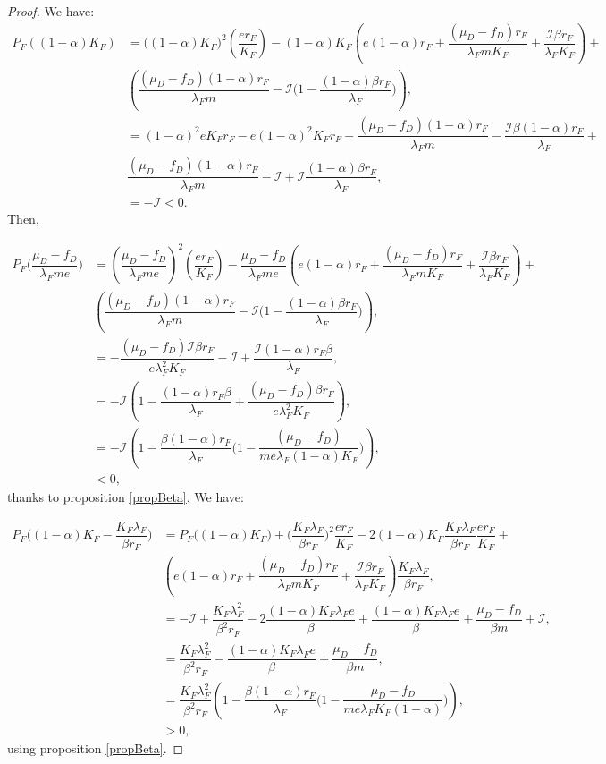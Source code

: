 \documentclass{article}
\newcommand{\lfw}{\lambda_{F}}
\newcommand{\lfw}{\lambda_{F}}
\newcommand{\cI}{\mathcal{I}}
\begin{document}
\begin{proof}
We have:
\begin{align*}
P_F((1-\alpha) K_F) &= \Big((1-\alpha) K_F \Big)^2 \left(\dfrac{er_F}{K_F} \right) - (1-\alpha) K_F \left(e(1-\alpha)r_F + \dfrac{(\mu_D - f_D) r_F}{\lfw m K_F} + \dfrac{\cI \beta r_F}{\lfw K_F} \right) + \\ &\left(\dfrac{(\mu_D - f_D)(1-\alpha) r_F}{\lfw m} - \cI\Big(1 - \dfrac{(1-\alpha)\beta r_F}{\lfw} \Big) \right), \\
&=(1-\alpha)^2 e K_F r_F - e(1-\alpha)^2 K_F r_F - \dfrac{(\mu_D - f_D) (1-\alpha) r_F}{\lfw m} - \dfrac{\cI \beta (1-\alpha)r_F}{\lfw}  + \\ &\dfrac{(\mu_D - f_D)(1-\alpha) r_F}{\lfw m} - \cI +\cI \dfrac{(1-\alpha)\beta r_F}{\lfw}, \\
&= -\cI< 0.
\end{align*}
Then, 

\begin{align*}
P_F\Big(\dfrac{\mu_D - f_D}{\lfw m e}\Big) &= \left(\dfrac{\mu_D - f_D}{\lfw m e}\right)^2 \left(\dfrac{er_F}{K_F} \right) - \dfrac{\mu_D - f_D}{\lfw m e} \left(e(1-\alpha)r_F + \dfrac{(\mu_D - f_D) r_F}{\lfw m K_F} + \dfrac{\cI \beta r_F}{\lfw K_F} \right) + \\ & \left(\dfrac{(\mu_D - f_D)(1-\alpha) r_F}{\lfw m} - \cI\Big(1 - \dfrac{(1-\alpha)\beta r_F}{\lfw} \Big) \right), \\
&= - \dfrac{(\mu_D - f_D) \cI \beta r_F}{e \lfw ^2 K_F} - \cI + \dfrac{\cI (1-\alpha)r_F \beta}{\lfw}, \\
&= -\cI \left( 1 - \dfrac{(1-\alpha)r_F \beta }{\lfw} + \dfrac{(\mu_D - f_D)  \beta r_F}{e \lfw ^2 K_F} \right), \\
&= -\cI \left( 1 - \dfrac{\beta(1-\alpha)r_F  }{\lfw}\Big(1 - \dfrac{(\mu_D - f_D) }{ m e \lfw (1-\alpha) K_F}\Big) \right), \\
& < 0,
\end{align*}
thanks to proposition \ref{propBeta}. We have:

\begin{align*}
P_F\Big((1-\alpha)K_F - \dfrac{K_F \lfw}{\beta r_F}\Big) &= P_F\Big((1-\alpha)K_F\Big) + \Big(\dfrac{K_F \lfw}{\beta r_F}\Big)^2 \dfrac{er_F}{K_F} - 2(1-\alpha)K_F \dfrac{K_F \lfw}{\beta r_F}\dfrac{er_F}{K_F} + \\ &\left(e(1-\alpha)r_F + \dfrac{(\mu_D - f_D) r_F}{\lfw m K_F} + \dfrac{\cI \beta r_F}{\lfw K_F} \right) \dfrac{K_F \lfw}{\beta r_F}, \\
&= -\cI + \dfrac{K_F \lfw^2}{\beta^2 r_F} - 2 \dfrac{(1-\alpha)K_F \lfw e}{\beta} +\dfrac{(1-\alpha)K_F \lfw e}{\beta} + \dfrac{\mu_D - f_D}{\beta m} + \cI, \\
&= \dfrac{K_F \lfw^2}{\beta^2 r_F} -  \dfrac{(1-\alpha)K_F \lfw e}{\beta} + \dfrac{\mu_D - f_D}{\beta m}, \\
&= \dfrac{K_F \lfw^2}{\beta^2 r_F} \left(1 - \dfrac{\beta (1-\alpha) r_F}{\lfw} \Big(1 - \dfrac{\mu_D - f_D}{m e \lfw K_F(1-\alpha)} \Big) \right), \\
&> 0,
\end{align*}
using proposition \ref{propBeta}.


\end{proof}
\end{document}
